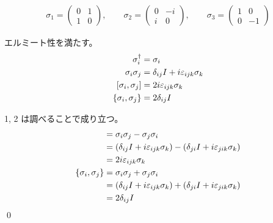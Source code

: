 \documentclass[uplatex,dvipdfmx,a4paper,11pt]{jlreq}
\makeatletter
\numberwithin{equation}{section}
\theoremstyle{definition}
\renewenvironment{proof}[1][\proofname]{\par
  \normalfont
  \topsep6\p@\@plus6\p@ \trivlist
  \item[\hskip\labelsep{\bfseries #1}\@addpunct{\bfseries}]\ignorespaces\quad\par
}{%
  \qed\endtrivlist\@endpefalse
}
\renewcommand\proofname{証明}
\makeatother
\begin{document}
\begin{definition}[パウリ行列]
  \begin{align}
    \sigma_1 = \begin{pmatrix}
                 0 & 1 \\
                 1 & 0
               \end{pmatrix}, \qquad
    \sigma_2 = \begin{pmatrix}
                 0 & -i \\
                 i & 0
               \end{pmatrix}, \qquad
    \sigma_3 = \begin{pmatrix}
                 1 & 0  \\
                 0 & -1
               \end{pmatrix}
  \end{align}
\end{definition}

\begin{proposition}[パウリ行列の性質]
  エルミート性を満たす。
  \begin{align}
    \sigma_i^\dagger         & = \sigma_i                                  \\
    \sigma_i\sigma_j         & = \delta_{ij}I + i\varepsilon_{ijk}\sigma_k \\
    [\sigma_i, \sigma_j]     & = 2i\varepsilon_{ijk}\sigma_k               \\
    \qty{\sigma_i, \sigma_j} & = 2\delta_{ij}I
  \end{align}
\end{proposition}
\begin{proof}
  1, 2 は調べることで成り立つ。
  \begin{align}
    [\sigma_i, \sigma_j]     & = \sigma_i\sigma_j - \sigma_j\sigma_i                                                       \\
                             & = (\delta_{ij}I + i\varepsilon_{ijk}\sigma_k) - (\delta_{ji}I + i\varepsilon_{jik}\sigma_k) \\
                             & = 2i\varepsilon_{ijk}\sigma_k                                                               \\
    \qty{\sigma_i, \sigma_j} & = \sigma_i\sigma_j + \sigma_j\sigma_i                                                       \\
                             & = (\delta_{ij}I + i\varepsilon_{ijk}\sigma_k) + (\delta_{ji}I + i\varepsilon_{jik}\sigma_k) \\
                             & = 2\delta_{ij}I
  \end{align}
\end{proof}
\end{document}
